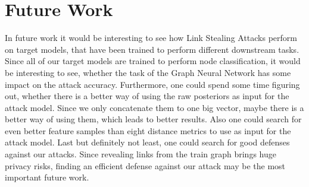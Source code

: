     \section{Future Work}
        In future work it would be interesting to see how Link Stealing Attacks perform on target models, that have been trained to perform different downstream tasks.
        Since all of our target models are trained to perform node classification, it would be interesting to see, whether the task of the Graph Neural Network has some impact on the attack accuracy.
        Furthermore, one could spend some time figuring out, whether there is a better way of using the raw posteriors as input for the attack model.
        Since we only concatenate them to one big vector, maybe there is a better way of using them, which leads to better results.
        Also one could search for even better feature samples than eight distance metrics to use as input for the attack model.
        Last but definitely not least, one could search for good defenses against our attacks.
        Since revealing links from the train graph brings huge privacy risks, finding an efficient defense against our attack may be the most important future work.